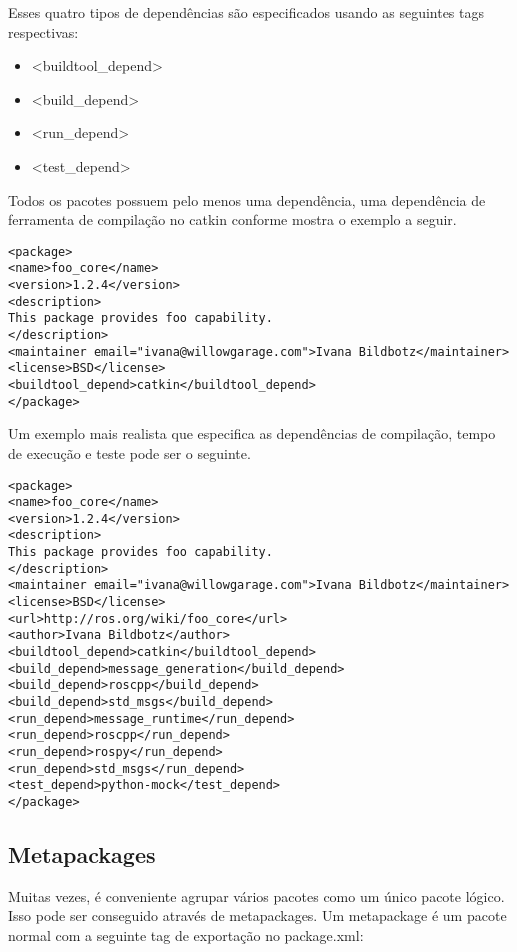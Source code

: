 Esses quatro tipos de dependências são especificados usando as seguintes tags respectivas:

\begin{itemize}
	\setlength{\itemsep}{1pt}
	\setlength{\parskip}{0pt}
	\setlength{\parsep}{0pt}
	\item <buildtool\_depend>
	\item<build\_depend>
	\item<run\_depend>
	\item<test\_depend>
\end{itemize}

Todos os pacotes possuem pelo menos uma dependência, uma dependência de ferramenta de compilação no catkin conforme mostra o exemplo a seguir.

\begin{verbatim}
<package>
<name>foo_core</name>
<version>1.2.4</version>
<description>
This package provides foo capability.
</description>
<maintainer email="ivana@willowgarage.com">Ivana Bildbotz</maintainer>
<license>BSD</license>
<buildtool_depend>catkin</buildtool_depend>
</package>
\end{verbatim}

Um exemplo mais realista que especifica as dependências de compilação, tempo de execução e teste pode ser o seguinte.

\begin{verbatim}
<package>
<name>foo_core</name>
<version>1.2.4</version>
<description>
This package provides foo capability.
</description>
<maintainer email="ivana@willowgarage.com">Ivana Bildbotz</maintainer>
<license>BSD</license>
<url>http://ros.org/wiki/foo_core</url>
<author>Ivana Bildbotz</author>
<buildtool_depend>catkin</buildtool_depend>
<build_depend>message_generation</build_depend>
<build_depend>roscpp</build_depend>
<build_depend>std_msgs</build_depend>
<run_depend>message_runtime</run_depend>
<run_depend>roscpp</run_depend>
<run_depend>rospy</run_depend>
<run_depend>std_msgs</run_depend>
<test_depend>python-mock</test_depend>
</package>
\end{verbatim}


\subsection{Metapackages}

Muitas vezes, é conveniente agrupar vários pacotes como um único pacote lógico. Isso pode ser conseguido através de metapackages. Um metapackage é um pacote normal com a seguinte tag de exportação no package.xml:

